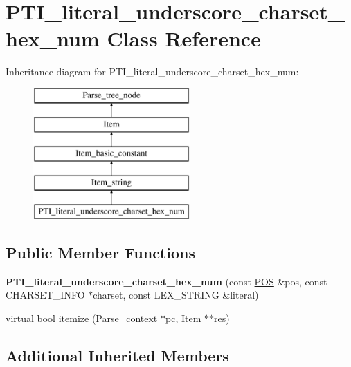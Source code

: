 \hypertarget{classPTI__literal__underscore__charset__hex__num}{}\section{P\+T\+I\+\_\+literal\+\_\+underscore\+\_\+charset\+\_\+hex\+\_\+num Class Reference}
\label{classPTI__literal__underscore__charset__hex__num}
Inheritance diagram for P\+T\+I\+\_\+literal\+\_\+underscore\+\_\+charset\+\_\+hex\+\_\+num\+:\begin{figure}[H]
\begin{center}
\leavevmode
\includegraphics[height=5.000000cm]{classPTI__literal__underscore__charset__hex__num}
\end{center}
\end{figure}
\subsection*{Public Member Functions}
\begin{DoxyCompactItemize}
\item 
\mbox{\label{classPTI__literal__underscore__charset__hex__num_ac0bb7cde79fbb213591870e7d461e913}} 
{\bfseries P\+T\+I\+\_\+literal\+\_\+underscore\+\_\+charset\+\_\+hex\+\_\+num} (const \mbox{\hyperlink{structYYLTYPE}{P\+OS}} \&pos, const C\+H\+A\+R\+S\+E\+T\+\_\+\+I\+N\+FO $\ast$charset, const L\+E\+X\+\_\+\+S\+T\+R\+I\+NG \&literal)
\item 
virtual bool \mbox{\hyperlink{classPTI__literal__underscore__charset__hex__num_a3117c9901a41eed32849849d8009384b}{itemize}} (\mbox{\hyperlink{structParse__context}{Parse\+\_\+context}} $\ast$pc, \mbox{\hyperlink{classItem}{Item}} $\ast$$\ast$res)
\end{DoxyCompactItemize}
\subsection*{Additional Inherited Members}


